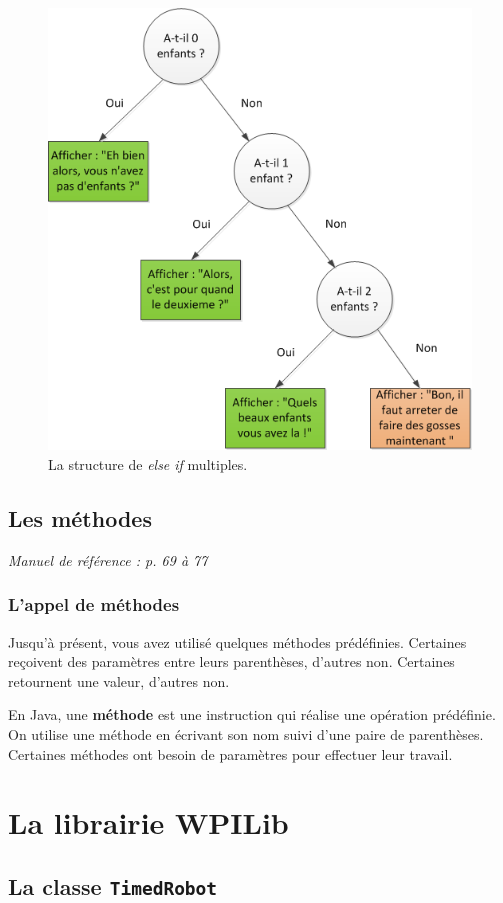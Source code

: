 \documentclass[12pt]{report}
\begin{document}
\begin{figure}[!htbp]
	\centering
	\includegraphics[width=0.6\linewidth]{else-if-multiples.png}
	\caption{La structure de \textit{else if} multiples.}
\end{figure}






\chapter{Les méthodes}

\textit{Manuel de référence : p. 69 à 77}

\section{L'appel de méthodes}

Jusqu'à présent, vous avez utilisé quelques méthodes prédéfinies. Certaines reçoivent des paramètres entre leurs parenthèses, d'autres non. Certaines retournent une valeur, d'autres non. 

En Java, une \textbf{méthode} est une instruction qui réalise une opération prédéfinie. On utilise une méthode en écrivant son nom suivi d'une paire de parenthèses. Certaines méthodes ont besoin de paramètres pour effectuer leur travail.





\part{La librairie WPILib}



\chapter{La classe \texttt{TimedRobot}}
\end{document}
